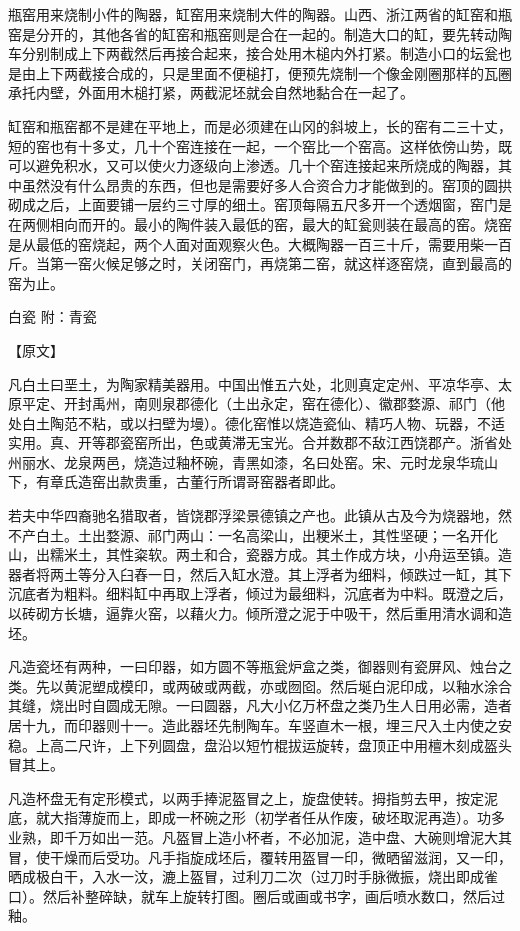 \documentclass[12pt,UTF8]{ctexbook}
\begin{document}
瓶窑用来烧制小件的陶器，缸窑用来烧制大件的陶器。山西、浙江两省的缸窑和瓶窑是分开的，其他各省的缸窑和瓶窑则是合在一起的。制造大口的缸，要先转动陶车分别制成上下两截然后再接合起来，接合处用木槌内外打紧。制造小口的坛瓮也是由上下两截接合成的，只是里面不便槌打，便预先烧制一个像金刚圈那样的瓦圈承托内壁，外面用木槌打紧，两截泥坯就会自然地黏合在一起了。

缸窑和瓶窑都不是建在平地上，而是必须建在山冈的斜坡上，长的窑有二三十丈，短的窑也有十多丈，几十个窑连接在一起，一个窑比一个窑高。这样依傍山势，既可以避免积水，又可以使火力逐级向上渗透。几十个窑连接起来所烧成的陶器，其中虽然没有什么昂贵的东西，但也是需要好多人合资合力才能做到的。窑顶的圆拱砌成之后，上面要铺一层约三寸厚的细土。窑顶每隔五尺多开一个透烟窗，窑门是在两侧相向而开的。最小的陶件装入最低的窑，最大的缸瓮则装在最高的窑。烧窑是从最低的窑烧起，两个人面对面观察火色。大概陶器一百三十斤，需要用柴一百斤。当第一窑火候足够之时，关闭窑门，再烧第二窑，就这样逐窑烧，直到最高的窑为止。

白瓷 附：青瓷

【原文】

凡白土曰垩土，为陶家精美器用。中国出惟五六处，北则真定定州、平凉华亭、太原平定、开封禹州，南则泉郡德化（土出永定，窑在德化）、徽郡婺源、祁门（他处白土陶范不粘，或以扫壁为墁）。德化窑惟以烧造瓷仙、精巧人物、玩器，不适实用。真、开等郡瓷窑所出，色或黄滞无宝光。合并数郡不敌江西饶郡产。浙省处州丽水、龙泉两邑，烧造过釉杯碗，青黑如漆，名曰处窑。宋、元时龙泉华琉山下，有章氏造窑出款贵重，古董行所谓哥窑器者即此。

若夫中华四裔驰名猎取者，皆饶郡浮梁景德镇之产也。此镇从古及今为烧器地，然不产白土。土出婺源、祁门两山：一名高梁山，出粳米土，其性坚硬；一名开化山，出糯米土，其性粢软。两土和合，瓷器方成。其土作成方块，小舟运至镇。造器者将两土等分入臼舂一日，然后入缸水澄。其上浮者为细料，倾跌过一缸，其下沉底者为粗料。细料缸中再取上浮者，倾过为最细料，沉底者为中料。既澄之后，以砖砌方长塘，逼靠火窑，以藉火力。倾所澄之泥于中吸干，然后重用清水调和造坯。

凡造瓷坯有两种，一曰印器，如方圆不等瓶瓮炉盒之类，御器则有瓷屏风、烛台之类。先以黄泥塑成模印，或两破或两截，亦或囫囵。然后埏白泥印成，以釉水涂合其缝，烧出时自圆成无隙。一曰圆器，凡大小亿万杯盘之类乃生人日用必需，造者居十九，而印器则十一。造此器坯先制陶车。车竖直木一根，埋三尺入土内使之安稳。上高二尺许，上下列圆盘，盘沿以短竹棍拔运旋转，盘顶正中用檀木刻成盔头冒其上。

凡造杯盘无有定形模式，以两手捧泥盔冒之上，旋盘使转。拇指剪去甲，按定泥底，就大指薄旋而上，即成一杯碗之形（初学者任从作废，破坯取泥再造）。功多业熟，即千万如出一范。凡盔冒上造小杯者，不必加泥，造中盘、大碗则增泥大其冒，使干燥而后受功。凡手指旋成坯后，覆转用盔冒一印，微晒留滋润，又一印，晒成极白干，入水一汶，漉上盔冒，过利刀二次（过刀时手脉微振，烧出即成雀口）。然后补整碎缺，就车上旋转打图。圈后或画或书字，画后喷水数口，然后过釉。
\end{document}
